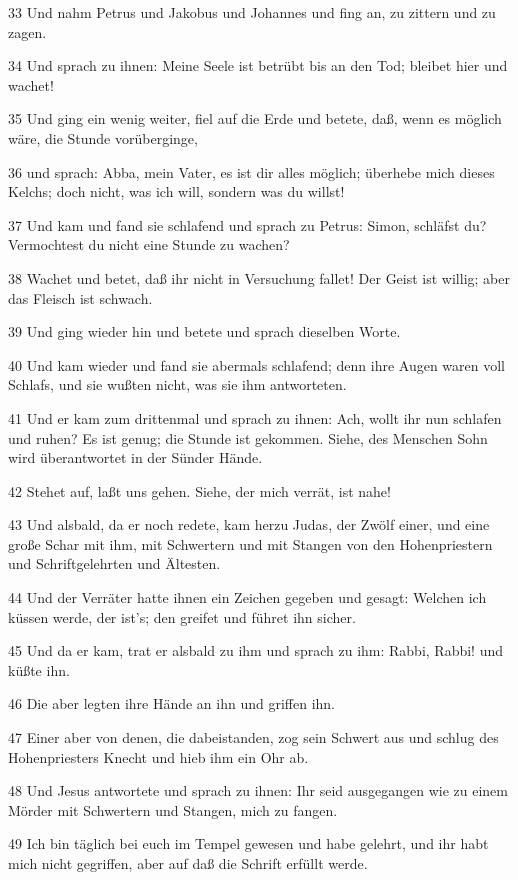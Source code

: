 \par 33 Und nahm Petrus und Jakobus und Johannes und fing an, zu zittern und zu zagen.
\par 34 Und sprach zu ihnen: Meine Seele ist betrübt bis an den Tod; bleibet hier und wachet!
\par 35 Und ging ein wenig weiter, fiel auf die Erde und betete, daß, wenn es möglich wäre, die Stunde vorüberginge,
\par 36 und sprach: Abba, mein Vater, es ist dir alles möglich; überhebe mich dieses Kelchs; doch nicht, was ich will, sondern was du willst!
\par 37 Und kam und fand sie schlafend und sprach zu Petrus: Simon, schläfst du? Vermochtest du nicht eine Stunde zu wachen?
\par 38 Wachet und betet, daß ihr nicht in Versuchung fallet! Der Geist ist willig; aber das Fleisch ist schwach.
\par 39 Und ging wieder hin und betete und sprach dieselben Worte.
\par 40 Und kam wieder und fand sie abermals schlafend; denn ihre Augen waren voll Schlafs, und sie wußten nicht, was sie ihm antworteten.
\par 41 Und er kam zum drittenmal und sprach zu ihnen: Ach, wollt ihr nun schlafen und ruhen? Es ist genug; die Stunde ist gekommen. Siehe, des Menschen Sohn wird überantwortet in der Sünder Hände.
\par 42 Stehet auf, laßt uns gehen. Siehe, der mich verrät, ist nahe!
\par 43 Und alsbald, da er noch redete, kam herzu Judas, der Zwölf einer, und eine große Schar mit ihm, mit Schwertern und mit Stangen von den Hohenpriestern und Schriftgelehrten und Ältesten.
\par 44 Und der Verräter hatte ihnen ein Zeichen gegeben und gesagt: Welchen ich küssen werde, der ist's; den greifet und führet ihn sicher.
\par 45 Und da er kam, trat er alsbald zu ihm und sprach zu ihm: Rabbi, Rabbi! und küßte ihn.
\par 46 Die aber legten ihre Hände an ihn und griffen ihn.
\par 47 Einer aber von denen, die dabeistanden, zog sein Schwert aus und schlug des Hohenpriesters Knecht und hieb ihm ein Ohr ab.
\par 48 Und Jesus antwortete und sprach zu ihnen: Ihr seid ausgegangen wie zu einem Mörder mit Schwertern und Stangen, mich zu fangen.
\par 49 Ich bin täglich bei euch im Tempel gewesen und habe gelehrt, und ihr habt mich nicht gegriffen, aber auf daß die Schrift erfüllt werde.
